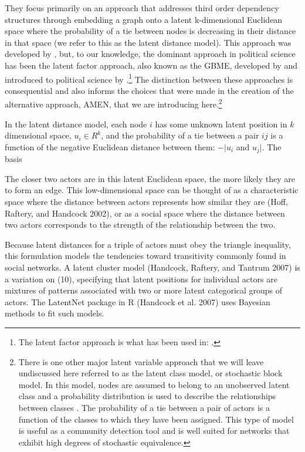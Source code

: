 They focus primarily on an approach that addresses third order dependency structures through embedding a graph onto a latent k-dimensional Euclidean space where the probability of a tie between nodes is decreasing in their distance in that space (we refer to this as the latent distance model). This approach was developed by \citet{hoff:etal:2002}, but, to our knowledge, the dominant approach in political science has been the latent factor approach, also known as the GBME, developed by \citet{hoff:2005} and introduced to political science by \citet{hoff:ward:2004}.\footnote{The latent factor approach is what has been used in: \citet{ward:etal:2007,cao:ward:2014,metternich:etal:2015}.} The distinction between these approaches is consequential and also informs the choices that were made in the creation of the alternative approach, AMEN, that we are introducing here.\footnote{There is one other major latent variable approach that we will leave undiscussed here referred to as the latent class model, or stochastic block model. In this model, nodes are assumed to belong to an unobserved latent class and a probability distribution is used to describe the relationships between classes \citep{nowicki:snijders:2001}. The probability of a tie between a pair of actors is a function of the classes to which they have been assigned. This type of model is useful as a community detection tool and is well suited for networks that exhibit high degrees of stochastic equivalence.} 


In the latent distance model, each node $i$ has some unknown latent position in $k$ dimensional space, $u_{i} \in R^{k}$, and the probability of a tie between a pair $ij$ is a function of the negative Euclidean distance between them: $-|u_{i}$ and $u_{j}|$. The basis 

The closer two actors are in this latent Euclidean space, the more likely they are to form an edge. This low-dimensional space can be thought of as a characteristic space where the distance between actors represents how similar they are (Hoff, Raftery, and Handcock 2002), or as a social space where the distance between two actors corresponds to the strength of the relationship between the two.

Because latent distances for a triple of actors must obey the triangle inequality, this formulation models the tendencies toward transitivity commonly found in social networks. A latent cluster model (Handcock, Raftery, and Tantrum 2007) is a variation on (10), specifying that latent positions for individual actors are mixtures of patterns associated with two or more latent categorical groups of actors. The LatentNet package in R (Handcock et al. 2007) uses Bayesian methods to fit such models.

